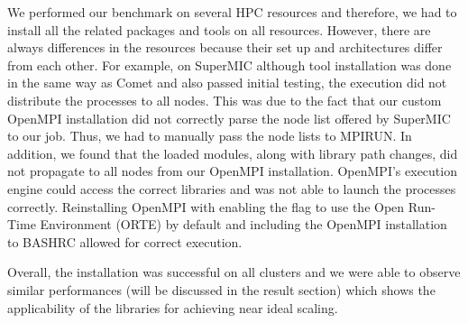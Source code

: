 We performed our benchmark on several HPC resources and therefore, we had to install all the related packages and tools on all resources.
However, there are always differences in the resources because their set up and architectures differ from each other. 
For example, on SuperMIC although tool installation was done in the same way as Comet and also passed initial testing, the execution did not distribute the processes to all nodes. 
This was due to the fact that our custom OpenMPI installation did not correctly parse the node list offered by SuperMIC to our job. 
Thus, we had to manually pass the node lists to MPIRUN. 
In addition, we found that the loaded modules, along with library path changes, did not propagate to all nodes from our OpenMPI installation. 
OpenMPI's execution engine could  access the correct libraries and was not able to launch the processes correctly. 
Reinstalling OpenMPI with enabling the flag to use the Open Run-Time Environment (ORTE) by default and including the OpenMPI installation to BASHRC allowed for correct execution.
 
Overall, the installation was successful on all clusters and we were able to observe similar
performances (will be discussed in the result section) which shows the applicability of the 
libraries for achieving near ideal scaling. 

